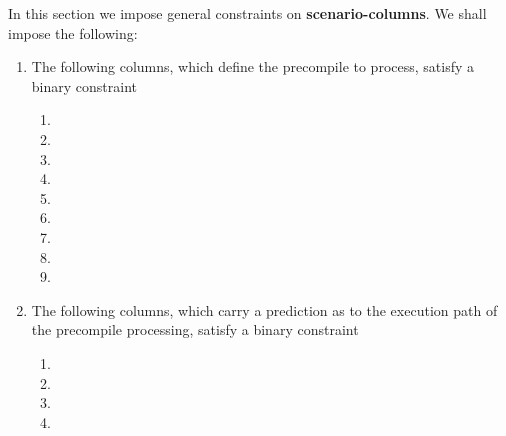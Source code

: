 \begin{center}
\end{center}
In this section we impose general constraints on \textbf{scenario-columns}. We shall impose the following:
\begin{enumerate}
	\item The following columns, which define the precompile to process, satisfy a binary constraint \lispDone{}
		\begin{enumerate}
			\item \scenEcrecover{}
			\item \scenShaTwo{}
			\item \scenRipemd{}
			\item \scenIdentity{}
			\item \scenModexp{}
			\item \scenEcadd{}
			\item \scenEcmul{}
			\item \scenEcpairing{}
			\item \scenBlake{}
		\end{enumerate}
	\item The following columns, which carry a prediction as to the execution path of the precompile processing, satisfy a binary constraint \lispDone{}
		\begin{enumerate}[resume]
			\item \scenPrcFailureKnownToHub{}
			\item \scenPrcFailureKnownToRam{}
			\item \scenPrcSuccessWillRevert{}
			\item \scenPrcSuccessWontRevert{}
		\end{enumerate}
\end{enumerate}
